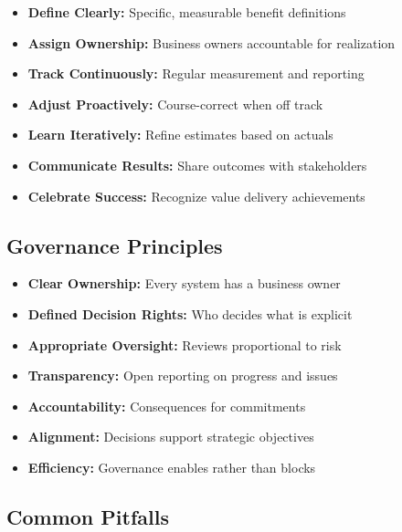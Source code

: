 \documentclass[11pt,letterpaper]{article}
\begin{document}
\begin{valuebox}
\begin{itemize}[nosep]
    \item \textbf{Define Clearly:} Specific, measurable benefit definitions
    \item \textbf{Assign Ownership:} Business owners accountable for realization
    \item \textbf{Track Continuously:} Regular measurement and reporting
    \item \textbf{Adjust Proactively:} Course-correct when off track
    \item \textbf{Learn Iteratively:} Refine estimates based on actuals
    \item \textbf{Communicate Results:} Share outcomes with stakeholders
    \item \textbf{Celebrate Success:} Recognize value delivery achievements
\end{itemize}
\end{valuebox}

\subsection{Governance Principles}

\begin{governbox}
\begin{itemize}[nosep]
    \item \textbf{Clear Ownership:} Every system has a business owner
    \item \textbf{Defined Decision Rights:} Who decides what is explicit
    \item \textbf{Appropriate Oversight:} Reviews proportional to risk
    \item \textbf{Transparency:} Open reporting on progress and issues
    \item \textbf{Accountability:} Consequences for commitments
    \item \textbf{Alignment:} Decisions support strategic objectives
    \item \textbf{Efficiency:} Governance enables rather than blocks
\end{itemize}
\end{governbox}

\subsection{Common Pitfalls}
\end{document}
